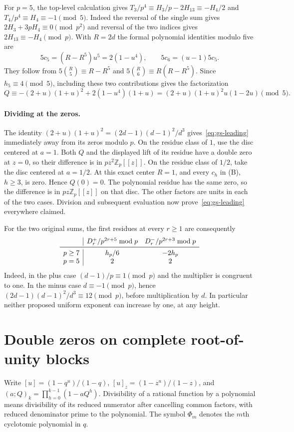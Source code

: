 \documentclass[11pt,a4paper]{article}
\numberwithin{equation}{section}
\begin{document}
For $p=5$, the top-level calculation gives
$T_3/p^4\equiv H_3/p-2H_{13}\equiv-H_4/2$ and
$T_4/p^4\equiv H_4\equiv-1\pmod5$. Indeed the reversal of the
single sum gives $2H_3+3pH_4\equiv0\pmod{p^2}$ and reversal of
the two indices gives $2H_{13}\equiv-H_4\pmod p$.
With $R=2d$ the formal polynomial identities modulo five are
\[
 5c_5=(R-R^5)u^5=2(1-u^4),\qquad 5c_6=(u-1)5c_5 .
\]
They follow from $5\binom R5\equiv R-R^5$ and
$5\binom R6\equiv R(R-R^5)$. Since $h_5\equiv4\pmod5$,
including these two contributions gives the factorization
\[
 Q\equiv-(2+u)(1+u)^2+2(1-u^4)(1+u)
       =(2+u)(1+u)^2u(1-2u)\pmod5.
\]

\paragraph{Dividing at the zeros.}
The identity $(2+u)(1+u)^2=(2d-1)(d-1)^2/d^3$
gives~\eqref{eq:gs-leading} immediately away from its zeros modulo $p$.
On the residue class of $1$, use the disc centered at $a=1$.
Both $Q$ and the displayed lift of its residue have a double zero at
$z=0$, so their difference is in $p z^2\mathbb Z_p[[z]]$.
On the residue class of $1/2$, take the disc centered at $a=1/2$.
At this exact center $R=1$, and every $c_h$ in (B), $h\ge3$, is zero.
Hence $Q(0)=0$. The polynomial residue has the same zero, so the
difference is in $p z\mathbb Z_p[[z]]$ on that disc. The other factors
are units in each of the two cases. Division and subsequent evaluation
now prove~\eqref{eq:gs-leading} everywhere claimed.

For the two original sums, the first residues at every $r\ge1$ are consequently
\[
\begin{array}{c|cc}
 &D^+_r/p^{2r+5}\bmod p&D^-_r/p^{2r+3}\bmod p\\\midrule
 p\ge7 &h_p/6&-2h_p\\
 p=5&2&2
\end{array}
\]
Indeed, in the plus case $(d-1)/p\equiv1\pmod p$ and the multiplier is congruent to one. In the minus case $d\equiv-1\pmod p$, hence $(2d-1)(d-1)^2/d^3\equiv12\pmod p$, before multiplication by $d$. In particular neither proposed uniform exponent can increase by one, at any height.

\section{Double zeros on complete root-of-unity blocks}
Write $[u]=(1-q^u)/(1-q)$, $[u]_z=(1-z^u)/(1-z)$, and
$(a;Q)_k=\prod_{h=0}^{k-1}(1-aQ^h)$. Divisibility of a rational function
by a polynomial means divisibility of its reduced numerator after cancelling
common factors, with reduced denominator prime to the polynomial. The symbol
$\Phi_m$ denotes the $m$th cyclotomic polynomial in $q$.
\end{document}
